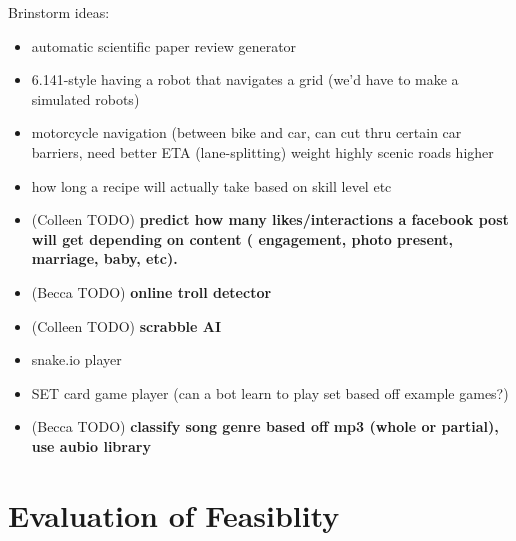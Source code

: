 \documentclass[12pt]{article}
\begin{document}
Brinstorm ideas:
\begin{itemize}
  \item automatic scientific paper review generator
  \item 6.141-style having a robot that navigates a grid (we'd have to make a simulated robots)
  \item  motorcycle navigation (between bike and car, can cut thru certain car barriers, need better ETA (lane-splitting)  weight highly scenic roads higher
  \item how long a recipe will actually take based on skill level etc
  \item (Colleen TODO) \textbf{predict how many likes/interactions a facebook post will get depending on content ( engagement, photo present, marriage, baby, etc).}
  \item  (Becca TODO) \textbf{online troll detector}
  \item (Colleen TODO) \textbf{scrabble AI}
  \item snake.io player
  \item SET card game player (can a bot learn to play set based off example games?)
  \item (Becca TODO) \textbf{classify song genre based off mp3 (whole or partial), use aubio library}
\end{itemize}

\section{Evaluation of Feasiblity}
\end{document}
